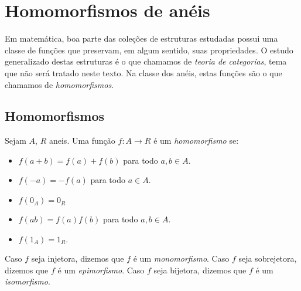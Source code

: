 \chapter{Homomorfismos de anéis}
Em matemática, boa parte das coleções de estruturas estudadas possui uma classe de funções que preservam, em algum sentido, suas propriedades.
O estudo generalizado destas estruturas é o que chamamos de \emph{teoria de categorias}, tema que não será tratado neste texto.
Na classe dos anéis, estas funções são o que chamamos de \emph{homomorfismos}.
\section{Homomorfismos}
\begin{definition}
Sejam $A$, $R$ aneis. Uma função $f:A\rightarrow R$ é um \emph{homomorfismo} se:
\begin{itemize}
    \item $f(a+b)=f(a)+f(b)$ para todo $a, b \in A$.
    \item $f(-a)=-f(a)$ para todo $a \in A$.
    \item $f(0_A)=0_R$
    \item $f(ab)=f(a)f(b)$ para todo $a, b \in A$.
    \item $f(1_A)=1_R$.
\end{itemize}

Caso $f$ seja injetora, dizemos que $f$ é um \emph{monomorfismo}. Caso $f$ seja sobrejetora, dizemos que $f$ é um \emph{epimorfismo}. Caso $f$ seja bijetora, dizemos que $f$ é um \emph{isomorfismo}.
\end{definition}

